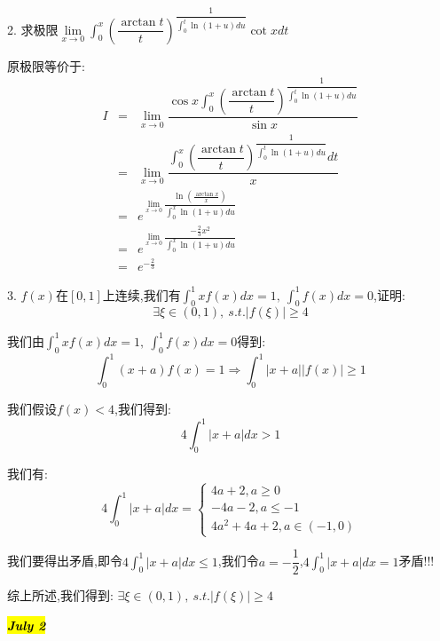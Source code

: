 2. 求极限$\lim\limits_{x\rightarrow 0}\int_{0}^{x}(\dfrac{\arctan t}{t})^{\dfrac{1}{\int_{0}^{t}\ln(1+u)du}}\cot xdt$
\begin{solution}
	
	原极限等价于: 
	\begin{eqnarray*}
		I&=&\lim\limits_{x\rightarrow 0}\dfrac{\cos x\int_{0}^{x}(\dfrac{\arctan t}{t})^{\dfrac{1}{\int_{0}^{t}\ln(1+u)du}}}{\sin x}\\
		&=&\lim\limits_{x\rightarrow 0}\dfrac{\int_{0}^{x}(\dfrac{\arctan t}{t})^{\dfrac{1}{\int_{0}^{t}\ln(1+u)du}}dt}{x}\\
		&=&e^{\lim\limits_{x\rightarrow 0}\dfrac{\ln(\frac{\arctan x}{x})}{\int_{0}^{x}\ln(1+u)du}}\\
		&=&e^{\lim\limits_{x\rightarrow 0}\dfrac{-\frac{2}{3}x^2}{\int_{0}^{x}\ln(1+u)du}}\\
		&=&e^{-\frac{2}{3}}
	\end{eqnarray*}
\end{solution}

3. $f(x)$在$[0,1]$上连续,我们有$\int_{0}^{1}xf(x)dx=1,\ \int_{0}^{1}f(x)dx=0$,证明: $$\exists\xi\in(0,1),\ s.t. |f(\xi)|\geq 4$$
\begin{solution}
	
	我们由$\int_{0}^{1}xf(x)dx=1,\ \int_{0}^{1}f(x)dx=0$得到: 
	$$\int_{0}^{1}(x+a)f(x)=1\Rightarrow \int_{0}^{1}|x+a||f(x)|\geq 1$$
	
	我们假设$f(x)<4$,我们得到: 
	$$4\int_{0}^{1}|x+a|dx>1$$
	
	我们有: $$4\int_{0}^{1}|x+a|dx=\left\lbrace
	\begin{array}{l}
		4a+2,a\geq 0\\
		-4a-2,a\leq -1\\
		4a^2+4a+2,a\in(-1,0)
	\end{array}
	\right. $$
	
	我们要得出矛盾,即令$4\int_{0}^{1}|x+a|dx\leq 1$,我们令$a=-\dfrac{1}{2}$,$4\int_{0}^{1}|x+a|dx=1$矛盾!!!
	
	综上所述,我们得到: $\exists\xi\in(0,1),\ s.t. |f(\xi)|\geq 4$
\end{solution}

\hl{\textbf{\textit{July 2}}}

